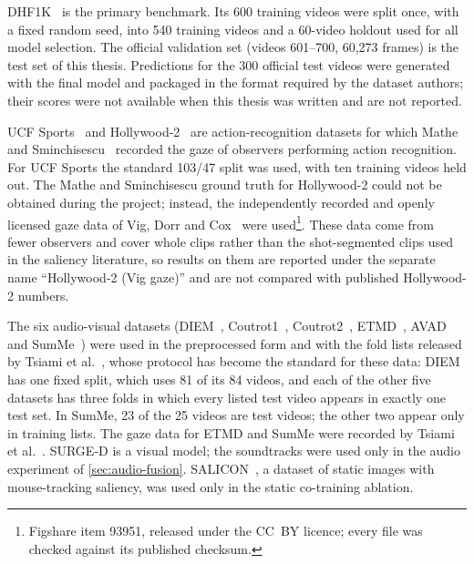 DHF1K~\cite{wang2018revisiting,wang2021revisiting} is the primary benchmark.
Its 600 training videos were split once, with a fixed random seed, into 540
training videos and a 60-video holdout used for all model selection. The
official validation set (videos 601--700, 60,273 frames) is the test set of
this thesis. Predictions for the 300 official test videos were generated with
the final model and packaged in the format required by the dataset authors;
their scores were not available when this thesis was written and are not
reported.

UCF Sports~\cite{rodriguez2008action} and Hollywood-2~\cite{marszalek2009actions}
are action-recognition datasets for which Mathe and
Sminchisescu~\cite{mathe2015actions} recorded the gaze of observers performing
action recognition. For UCF Sports the standard 103/47 split was used, with
ten training videos held out. The Mathe and Sminchisescu ground truth for
Hollywood-2 could not be obtained during the project; instead, the
independently recorded and openly licensed gaze data of Vig, Dorr and
Cox~\cite{vig2012space} were used\footnote{Figshare item 93951, released under
the CC~BY licence; every file was checked against its published checksum.}.
These data come from fewer observers and cover whole clips rather than the
shot-segmented clips used in the saliency literature, so results on them are
reported under the separate name \enquote{Hollywood-2 (Vig gaze)} and are not
compared with published Hollywood-2 numbers.

The six audio-visual datasets (DIEM~\cite{mital2011clustering},
Coutrot1~\cite{coutrot2014how}, Coutrot2~\cite{coutrot2015efficient},
ETMD~\cite{koutras2015perceptually}, AVAD~\cite{min2016fixation} and
SumMe~\cite{gygli2014creating}) were used in the preprocessed form and with
the fold lists released by Tsiami et al.~\cite{tsiami2020stavis}, whose
protocol has become the standard for these data: DIEM has one fixed split,
which uses 81 of its 84 videos, and each of the other five datasets has three
folds in which every listed test video appears in exactly one test set. In
SumMe, 23 of the 25 videos are test videos; the other two appear only in
training lists. The gaze data for ETMD and SumMe were
recorded by Tsiami et al.~\cite{tsiami2019behaviorally}. SURGE-D is a
visual model; the soundtracks were used only in the audio experiment of
\cref{sec:audio-fusion}. SALICON~\cite{jiang2015salicon}, a dataset of static
images with mouse-tracking saliency, was used only in the static co-training
ablation.

